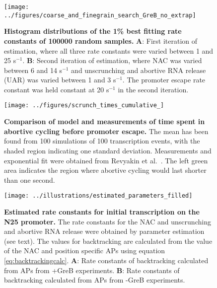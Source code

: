 \begin{figure}[h]
    \begin{center}
      \texttt{[image: ../figures/coarse\_and\_finegrain\_search\_GreB\_no\_extrap]}
    \end{center}
  \caption{ {\bf Histogram distributions of the 1\% best fitting rate
    constants of 100000 random samples.} \textbf{A}: First iteration of
    estimation, where all three rate constants were varied between 1 and 25
    s$^{-1}$. \textbf{B}: Second iteration of estimation, where NAC was varied
    between 6 and 14 s$^{-1}$ and unscrunching and abortive RNA release (UAR)
    was varied between 1 and 3 s$^{-1}$. The promoter escape rate constant was
    held constant at 20 s$^{-1}$ in the second iteration.}
    \label{fig:parameter_estimation_proper}
\end{figure}

\begin{figure}[h]
    \begin{center}
      \texttt{[image: ../figures/scrunch\_times\_cumulative\_]}
    \end{center}
  \caption{{\bf Comparison of model and measurements of time spent in abortive
        cycling before promoter escape.} The mean has been found from 100
        simulations of 100 transcription events, with the shaded region
        indicating one standard deviation. Measurements and exponential fit
        were obtained from Revyakin et al.\ \cite{revyakin_abortive_2006}. The
        left green area indicates the region where abortive cycling would last
        shorter than one second.}
\label{fig:revyakin_fit}
\end{figure}

\begin{figure}[h]
    \begin{center}
      \texttt{[image: ../illustrations/estimated\_parameters\_filled]}
    \end{center}
    \caption{ {\bf Estimated rate constants for initial transcription on the N25
      promoter.} The rate constants for the NAC and unscrunching and abortive
      RNA release were obtained by parameter estimation (see text). The values
      for backtracking are calculated from the value of the NAC and position
      specific APs using equation \eqref{eq:backtrackingcalc}. \textbf{A}:
      Rate constants of backtracking calculated from APs from +GreB
      experiments. \textbf{B}: Rate constants of backtracking calculated from
      APs from -GreB experiments.}
    \label{fig:estimated_parameters}
\end{figure}


